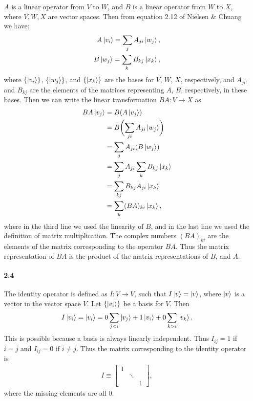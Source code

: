 \(A\) is a linear operator from \(V\) to \(W\), and \(B\) is a linear operator
from \(W\) to \(X\), where \(V, W, X\) are vector spaces. Then from equation
2.12 of Nielsen \& Chuang we have:
\begin{align}
  \label{eq:A-B-matrix-representation}
  A\ket{v_i} = \sum_{j} A_{ji}\ket{w_j}, \\
  B\ket{w_j} = \sum_{k} B_{kj}\ket{x_k},
\end{align}
where \(\{\ket{v_i}\}\), \(\{\ket{w_j}\}\), and \(\{\ket{x_k}\}\) are the bases
for \(V\), \(W\), \(X\), respectively, and \(A_{ji}\), and \(B_{kj}\) are the
elements of the matrices representing \(A\), \(B\), respectively, in these
bases. Then we can write the linear transformation \(BA: V \rightarrow X\) as
\begin{align}
  \label{eq:BA-matrix-representation}
  BA\ket{v_j} &= B(A\ket{v_j}) \nonumber\\
  &= B\biggl(\sum_{ji} A_{ji}\ket{w_j}\biggr) \nonumber\\
              &= \sum_{j} A_{ji} (B\ket{w_j}) \nonumber\\
              &= \sum_{j} A_{ji} \sum_{k} B_{kj}\ket{x_k} \nonumber\\
              &= \sum_{kj} B_{kj}A_{ji} \ket{x_k} \nonumber\\
  &= \sum_{k} (BA)_{ki} \ket{x_k},
\end{align}
where in the third line we used the linearity of \(B\), and in the last line we
used the definition of matrix multiplication. The complex numbers \((BA)_{ki}\)
are the elements of the matrix corresponding to the operator \(BA\). Thus the
matrix representation of \(BA\) is the product of the matrix representations of
\(B\), and \(A\).

\paragraph{2.4}

The identity operator is defined as \(I: V \rightarrow V\), such that \(I\ket{v}
= \ket{v}\), where \(\ket{v}\) is a vector in the vector space \(V\). Let
\(\{\ket{v_i}\}\) be a basis for \(V\). Then
\begin{align}
  \label{eq:I-matrix-representation}
  I\ket{v_i} = \ket{v_i}
  = 0 \sum_{j < i} \ket{v_j} + 1\ket{v_i} + 0 \sum_{k > i} \ket{v_k}.
\end{align}
This is possible because a basis is always linearly independent. Thus \(I_{ij} =
1\) if \(i = j\) and \(I_{ij} = 0\) if \(i \ne j\). Thus the matrix
corresponding to the identity operator is
\begin{align}
  \label{eq:I-matrix}
  I \equiv
  \begin{bmatrix}
    1 & &  \\
    & \ddots & \\
    & & 1
  \end{bmatrix},
\end{align}
where the missing elements are all \(0\).


